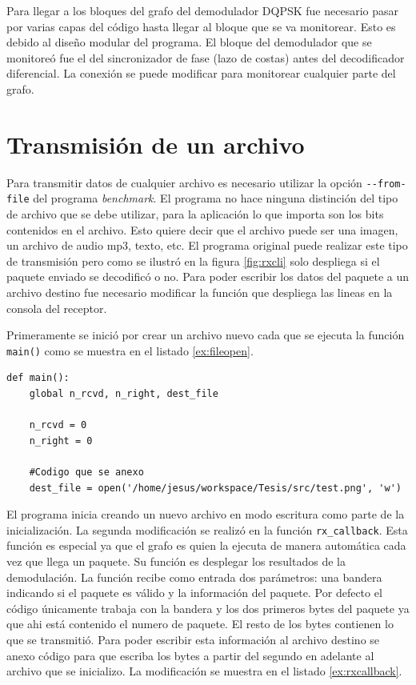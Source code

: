 Para llegar a los bloques del grafo del demodulador DQPSK fue necesario pasar por varias capas
del c\'odigo hasta llegar al bloque que se va monitorear. Esto es debido al dise\~no modular del
programa. El bloque del demodulador que se monitore\'o fue el del sincronizador de fase (lazo de
costas) antes del decodificador diferencial. La conexi\'on se puede modificar para monitorear
cualquier parte del grafo.

\section{Transmisi\'on de un archivo}
Para transmitir datos de cualquier archivo es necesario utilizar la opci\'on \verb|--from-file| del programa \emph{benchmark}. El
programa no hace ninguna distinci\'on del tipo de archivo que se debe utilizar, para la aplicaci\'on lo que importa son los bits
contenidos en el archivo. Esto quiere decir que el archivo puede ser una imagen, un archivo de audio mp3, texto, etc. El programa
original puede realizar este tipo de transmisi\'on pero como se ilustr\'o en la figura \ref{fig:rxcli} solo despliega si el
paquete enviado se decodific\'o o no. Para poder escribir los datos del paquete a un archivo destino fue necesario modificar la
funci\'on que despliega las lineas en la consola del receptor.

Primeramente se inici\'o por crear un archivo nuevo cada que se ejecuta la funci\'on \verb|main()|
como se muestra en el listado \ref{ex:fileopen}.

\begin{lstlisting}[float, label=ex:fileopen, caption={C\'odigo anexo a la funci\'on main del
programa benchmark para abrir un nuevo archivo destino.}, breaklines=true]
def main():
    global n_rcvd, n_right, dest_file

    n_rcvd = 0
    n_right = 0

	#Codigo que se anexo
    dest_file = open('/home/jesus/workspace/Tesis/src/test.png', 'w')
\end{lstlisting}

El programa inicia creando un nuevo archivo en modo escritura como parte de la inicializaci\'on. La
segunda modificaci\'on se realiz\'o en la funci\'on \verb|rx_callback|. Esta funci\'on es
especial ya que el grafo es quien la ejecuta de manera autom\'atica cada vez que llega un
paquete. Su funci\'on es desplegar los resultados de la demodulaci\'on. La funci\'on recibe como
entrada dos par\'ametros: una bandera indicando si el paquete es v\'alido y la informaci\'on del
paquete. Por defecto el c\'odigo \'unicamente trabaja con la bandera y los dos primeros bytes del
paquete ya que ahi est\'a contenido el numero de paquete. El resto de los bytes contienen lo que se
transmiti\'o. Para poder escribir esta informaci\'on al archivo destino se anexo c\'odigo para que
escriba los bytes a partir del segundo en adelante al archivo que se inicializo. La modificaci\'on
se muestra en el listado \ref{ex:rxcallback}.

